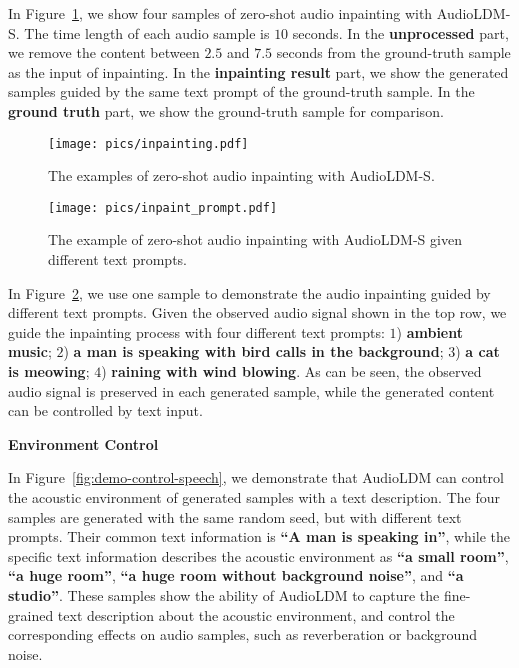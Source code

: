 In Figure~\ref{fig:demo-inpainting}, we show four samples of zero-shot audio inpainting with AudioLDM-S. The time length of each audio sample is $10$ seconds. In the \textbf{unprocessed} part, we remove the content between $2.5$ and $7.5$ seconds from the ground-truth sample as the input of inpainting. In the \textbf{inpainting result} part, we show the generated samples guided by the same text prompt of the ground-truth sample. In the \textbf{ground truth} part, we show the ground-truth sample for comparison.

\vspace{0.5cm}

\begin{figure}[htbp]
    \centering
    \texttt{[image: pics/inpainting.pdf]}
    \caption{The examples of zero-shot audio inpainting with AudioLDM-S.}
    \label{fig:demo-inpainting}
\vspace{0.5cm}
\end{figure}

\begin{figure}[htbp]
    \centering
    \texttt{[image: pics/inpaint\_prompt.pdf]}
    \caption{The example of zero-shot audio inpainting with AudioLDM-S given different text prompts.}
    \label{fig:demo-inpainting-prompt}
\vspace{0.5cm}
\end{figure}

In Figure~\ref{fig:demo-inpainting-prompt}, we use one sample to demonstrate the audio inpainting guided by different text prompts. Given the observed audio signal shown in the top row, we guide the inpainting process with four different text prompts: $1$) \textbf{ambient music}; $2$) \textbf{a man is speaking with bird calls in the background}; $3$) \textbf{a cat is meowing}; $4$) \textbf{raining with wind blowing}. As can be seen, the observed audio signal is preserved in each generated sample, while the generated content can be controlled by text input.   

\newpage

\vspace{0.5cm}

\textbf{Environment Control}

In Figure~\ref{fig:demo-control-speech}, we demonstrate that AudioLDM can control the acoustic environment of generated samples with a text description. The four samples are generated with the same random seed, but with different text prompts. Their common text information is \textbf{``A man is speaking in''}, while the specific text information describes the acoustic environment as \textbf{``a small room''}, \textbf{``a huge room''}, \textbf{``a huge room without background noise''}, and \textbf{``a studio''}. These samples show the ability of AudioLDM to capture the fine-grained text description about the acoustic environment, and control the corresponding effects on audio samples, such as reverberation or background noise.   
\vspace{0.5cm}

